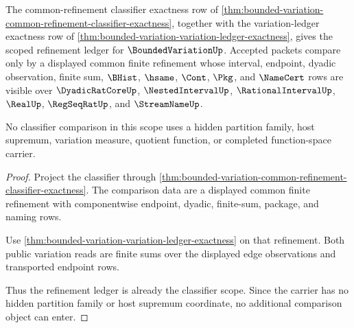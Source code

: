 \begin{theorem}
\label{thm:bounded-variation-refinement-ledger-scope}
The common-refinement classifier exactness row of \autoref{thm:bounded-variation-common-refinement-classifier-exactness}, together with the variation-ledger exactness row of \autoref{thm:bounded-variation-variation-ledger-exactness}, gives the scoped refinement ledger for $\BoundedVariationUp$. Accepted packets compare only by a displayed common finite refinement whose interval, endpoint, dyadic observation, finite sum, $\BHist$, $\hsame$, $\Cont$, $\Pkg$, and $\NameCert$ rows are visible over $\DyadicRatCoreUp$, $\NestedIntervalUp$, $\RationalIntervalUp$, $\RealUp$, $\RegSeqRatUp$, and $\StreamNameUp$.

No classifier comparison in this scope uses a hidden partition family, host supremum, variation measure, quotient function, or completed function-space carrier.
\end{theorem}
\begin{proof}
Project the classifier through \autoref{thm:bounded-variation-common-refinement-classifier-exactness}. The comparison data are a displayed common finite refinement with componentwise endpoint, dyadic, finite-sum, package, and naming rows.

Use \autoref{thm:bounded-variation-variation-ledger-exactness} on that refinement. Both public variation reads are finite sums over the displayed edge observations and transported endpoint rows.

Thus the refinement ledger is already the classifier scope. Since the carrier has no hidden partition family or host supremum coordinate, no additional comparison object can enter.
\end{proof}

